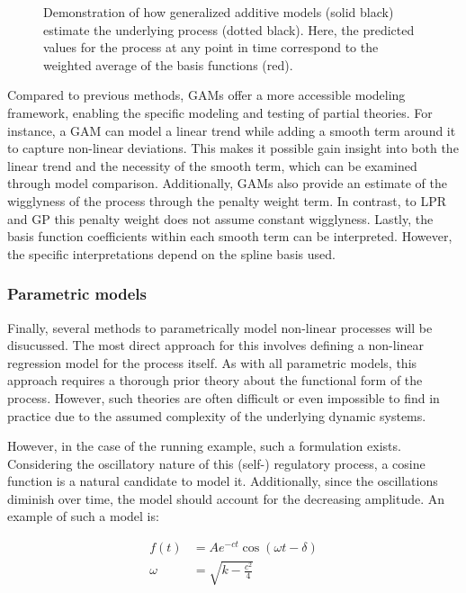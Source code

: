 \documentclass[man, floatsintext]{apa7}
\begin{document}
\begin{figure}[!ht]
  \caption{Demonstration of how generalized additive models (solid black)
    estimate the underlying process (dotted black). Here, the predicted values
    for the process at any point in time correspond to the weighted average of
    the basis functions (red).}
  \label{fig:gam_dem}
\end{figure}

Compared to previous methods, GAMs offer a more accessible modeling framework,
enabling the specific modeling and testing of partial theories. For instance, a
GAM can model a linear trend while adding a smooth term around it to capture
non-linear deviations. This makes it possible gain insight into both
the linear trend and the necessity of the smooth term, which can be examined
through model comparison.
Additionally, GAMs also provide an estimate of the wigglyness
of the process through the penalty weight term. In contrast, to LPR and GP
this penalty weight does not assume constant wigglyness. Lastly, the
basis function coefficients within each smooth term can be interpreted.
However, the specific interpretations depend on the spline basis used.

\subsubsection{Parametric models}

Finally, several methods to parametrically model non-linear processes will be
disucussed. The most direct approach for this involves defining a non-linear
regression model for the process itself. As with all parametric models,
this approach requires a thorough
prior theory about the functional form of the process. However, such theories
are often difficult or even impossible to find in practice due to the
assumed complexity of the underlying dynamic systems.

However, in the case of the running example, such a formulation exists.
Considering the oscillatory nature of this (self-) regulatory process,
a cosine function is a natural candidate to model it.
Additionally, since the oscillations diminish over time,
the model should account for the decreasing amplitude. An example of such a
model is:

\begin{equation}
  \begin{aligned}
    f(t)   & = A e^{-c t} \cos(\omega t - \delta) \\
    \omega & = \sqrt{k - \frac{c^2}{4}}
  \end{aligned}
\end{equation}
\end{document}
